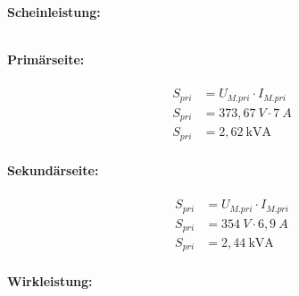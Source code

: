 \begin{enumerate}[label=\alph*)]
	      \textbf{Scheinleistung:}\\ \ \\
	      \begin{tcolorbox}[colback=gray!30,
			      colframe=black,
			      width=0.9\textwidth,
		      ]
		      \parbox{\textwidth}{

			      \begin{minipage}{0.5\textwidth}
				      \textbf{Primärseite:}\\ \ \\
				      \begin{align*}
					      S_{pri} & = U_{M.pri}\cdot I_{M.pri} \\
					      S_{pri} & = 373,67\ V\cdot 7\ A      \\
					      S_{pri} & = 2,62\ \text{kVA}         \\
				      \end{align*}
			      \end{minipage}\hfill
			      \begin{minipage}{0.5\textwidth}
				      \textbf{Sekundärseite:}\\ \ \\
				      \begin{align*}
					      S_{pri} & = U_{M.pri}\cdot I_{M.pri} \\
					      S_{pri} & = 354\ V\cdot 6,9\ A       \\
					      S_{pri} & = 2,44\ \text{kVA}         \\
				      \end{align*}
			      \end{minipage}
		      }
	      \end{tcolorbox}


	      \pagebreak
	      \textbf{Wirkleistung:}\\ \ \\
	      \begin{tcolorbox}[colback=gray!30,
			      colframe=black,
			      width=0.9\textwidth,
		      ]
		      \parbox{\textwidth}{

}
\end{tcolorbox}
\end{enumerate}
